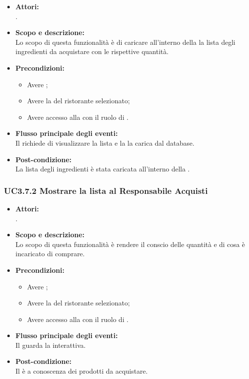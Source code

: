 \begin{itemize}
	\item \textbf{Attori:}
	\\.
	\item \textbf{Scopo e descrizione:} 
	\\Lo scopo di questa funzionalità è di caricare all'interno della  la lista degli ingredienti da acquistare con le rispettive quantità.
	\item \textbf{Precondizioni:}
	\begin{itemize}
		\item Avere ;
		\item Avere la  del ristorante selezionato;
		\item Avere accesso alla  con il ruolo di .
	\end{itemize}
	\item \textbf{Flusso principale degli eventi:}
	\\Il {} richiede di visualizzare la lista e la  la carica dal database.
	\item \textbf{Post-condizione:}
	\\La lista degli ingredienti è stata caricata all'interno della .
\end{itemize}

\subsubsection{UC3.7.2 Mostrare la lista al Responsabile Acquisti} \label{UC3.7.2}

\begin{itemize}
	\item \textbf{Attori:}
	\\.
	\item \textbf{Scopo e descrizione:} 
	\\Lo scopo di questa funzionalità è rendere il  conscio delle quantità e di cosa è incaricato di comprare.
	\item \textbf{Precondizioni:}
	\begin{itemize}
		\item Avere ;
		\item Avere la  del ristorante selezionato;
		\item Avere accesso alla  con il ruolo di .
	\end{itemize}
	\item \textbf{Flusso principale degli eventi:}
	\\Il {} guarda la  interattiva.
	\item \textbf{Post-condizione:}
	\\Il {} è a conoscenza dei prodotti da acquistare.
\end{itemize}

